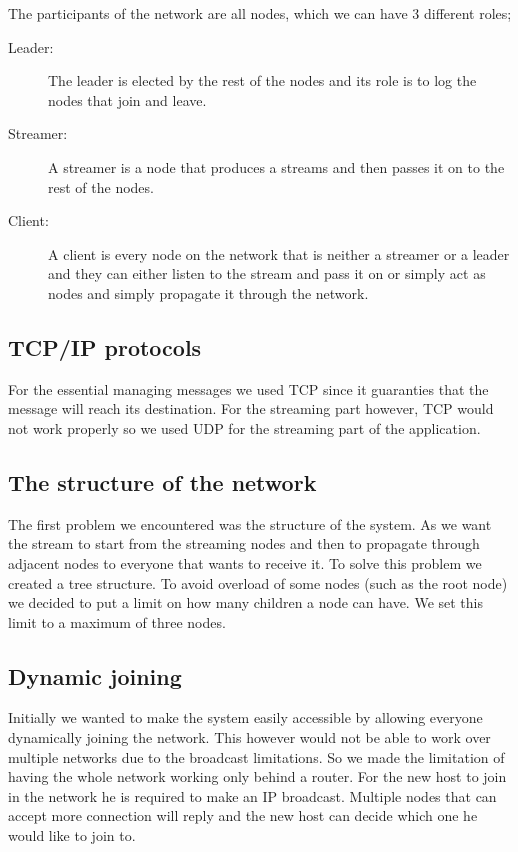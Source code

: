 The participants of the network are all nodes, which we can have 3 different roles;

\begin{description}
	\item[Leader: ] The leader is elected by the rest of the nodes and its role is to log the nodes that join and leave.
	\item[Streamer: ] A streamer is a node that produces a streams and then passes it on to the rest of the nodes.
	\item[Client: ] A client is every node on the network that is neither a streamer or a leader and they can either listen to the stream and pass it on or simply act as nodes and simply propagate it through the network.
\end{description}

\subsection{TCP/IP protocols}

For the essential managing messages we used TCP since it guaranties that the message will reach its destination. For the streaming part however, TCP would not work properly so we used UDP for the streaming part of the application. \\

\subsection{The structure of the network}

The first problem we encountered was the structure of the system. As we want the stream to start from the streaming nodes and then to propagate through adjacent nodes to everyone that wants to receive it. To solve this problem we created a tree structure. To avoid overload of some nodes (such as the root node) we decided to put a limit on how many children a node can have. We set this limit to a maximum of three nodes. \\

\subsection{Dynamic joining}

Initially we wanted to make the system easily accessible by allowing everyone dynamically joining the network. This however would not be able to work over multiple networks due to the broadcast limitations. So we made the limitation of having the whole network working only behind a router. For the new host to join in the network he is required to make an IP broadcast. Multiple nodes that can accept more connection will reply and the new host can decide which one he would like to join to.\\

